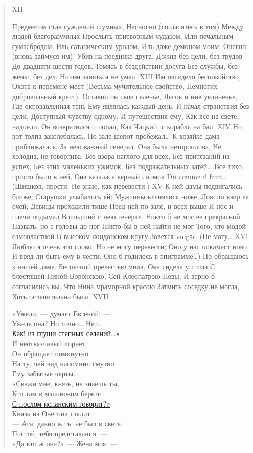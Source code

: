 \begin{verse}
XII

Предметом став суждений шумных,
Несносно (согласитесь в том)
Между людей благоразумных
Прослыть притворным чудаком,
Или печальным сумасбродом,
Иль сатаническим уродом,
Иль даже демоном моим.
Онегин (вновь займуся им),
Убив на поединке друга,
Дожив без цели, без трудов
До двадцати шести годов,
Томясь в бездействии досуга
Без службы, без жены, без дел,
Ничем заняться не умел.
XIII
Им овладело беспокойство,
Охота к перемене мест
(Весьма мучительное свойство,
Немногих добровольный крест).
Оставил он свое селенье,
Лесов и нив уединенье,
Где окровавленная тень
Ему являлась каждый день,
И начал странствия без цели,
Доступный чувству одному;
И путешествия ему,
Как все на свете, надоели;
Он возвратился и попал,
Как Чацкий, с корабля на бал.
XIV
Но вот толпа заколебалась,
По зале шепот пробежал…
К хозяйке дама приближалась,
За нею важный генерал.
Она была нетороплива,
Не холодна, не говорлива,
Без взора наглого для всех,
Без притязаний на успех,
Без этих маленьких ужимок,
Без подражательных затей…
Все тихо, просто было в ней,
Она казалась верный снимок
Du comme il faut… (Шишков, прости:
Не знаю, как перевести.)
XV
К ней дамы подвигались ближе;
Старушки улыбались ей;
Мужчины кланялися ниже,
Ловили взор ее очей;
Девицы проходили тише
Пред ней по зале, и всех выше
И нос и плечи подымал
Вошедший с нею генерал.
Никто б не мог ее прекрасной
Назвать; но с головы до ног
Никто бы в ней найти не мог
Того, что модой самовластной
В высоком лондонском кругу
Зовется vulgаr. (Не могу…
XVI
Люблю я очень это слово,
Но не могу перевести;
Оно у нас покамест ново,
И вряд ли быть ему в чести.
Оно б годилось в эпиграмме…)
Но обращаюсь к нашей даме.
Беспечной прелестью мила,
Она сидела у стола
С блестящей Ниной Воронскою,
Сей Клеопатрою Невы;
И верно б согласились вы,
Что Нина мраморной красою
Затмить соседку не могла,
Хоть ослепительна была.
XVII

«Ужели, — думает Евгений: —\\
Ужель она? Но точно… Нет…\\
\hyperref[villaggiio]{Как! из глуши степных селений…»}\\
И неотвязчивый лорнет\\
Он обращает поминутно\\
На ту, чей вид напомнил смутно\\
Ему забытые черты.\\
«Скажи мне, князь, не знаешь ты,\\
Кто там в малиновом берете\\
\hyperref[spagna]{С послом испанским говорит?»}\\
Князь на Онегина глядит.\\
— Ага! давно ж ты не был в свете.\\
Постой, тебя представлю я. —\\
«Да кто ж она?» — Жена моя. —


\end{verse}
